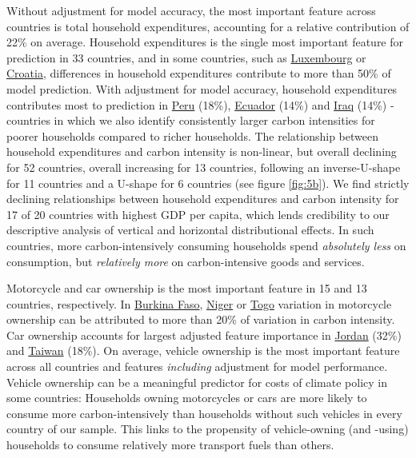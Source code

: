 \documentclass[12pt, a4paper]{article}
\begin{document}
Without adjustment for model accuracy, the most important feature across countries is total household expenditures, accounting for a relative contribution of 22\% on average. Household expenditures is the single most important feature for prediction in 33 countries, and in some countries, such as \hyperref[fig:5b_LUX]{Luxembourg} or \hyperref[fig:5b_HRV]{Croatia}, differences in household expenditures contribute to more than 50\% of model prediction. With adjustment for model accuracy, household expenditures contributes most to prediction in \hyperref[fig:5b_PER]{Peru} (18\%), \hyperref[fig:5b_ECU]{Ecuador} (14\%) and \hyperref[fig:5b_IRQ]{Iraq} (14\%) - countries in which we also identify consistently larger carbon intensities for poorer households compared to richer households. The relationship between household expenditures and carbon intensity is non-linear, but overall declining for 52 countries, overall increasing for 13 countries, following an inverse-U-shape for 11 countries and a U-shape for 6 countries (see figure \ref{fig:5b}). We find strictly declining relationships between household expenditures and carbon intensity for 17 of 20 countries with highest GDP per capita, which lends credibility to our descriptive analysis of vertical and horizontal distributional effects. In such countries, more carbon-intensively consuming households spend \textit{absolutely less} on consumption, but \textit{relatively more} on carbon-intensive goods and services.

Motorcycle and car ownership is the most important feature in 15 and 13 countries, respectively. In \hyperref[fig:5b_BFA]{Burkina Faso}, \hyperref[fig:5b_NER]{Niger} or \hyperref[fig:5b_TGO]{Togo} variation in motorcycle ownership can be attributed to more than 20\% of variation in carbon intensity. Car ownership accounts for largest adjusted feature importance in \hyperref[fig:5b_JOR]{Jordan} (32\%) and \hyperref[fig:5b_TWN]{Taiwan} (18\%). On average, vehicle ownership is the most important feature across all countries and features \textit{including} adjustment for model performance. Vehicle ownership can be a meaningful predictor for costs of climate policy in some countries: Households owning motorcycles or cars are more likely to consume more carbon-intensively than households without such vehicles in every country of our sample. This links to the propensity of vehicle-owning (and -using) households to consume relatively more transport fuels than others.
\end{document}
